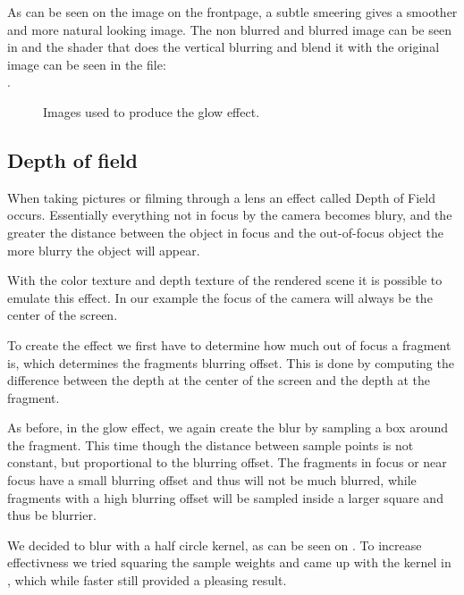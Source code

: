 As can be seen on the image on the frontpage, a subtle smeering gives
a smoother and more natural looking image. The non blurred and blurred
image can be seen in  and the shader that does the
vertical blurring and blend it with the original image can be seen in
the file:\\ .

\begin{figure}
  \centering
  \caption{Images used to produce the glow effect.}
  \label{fig:glow}
\end{figure}


\subsection{Depth of field}

When taking pictures or filming through a lens an effect called Depth
of Field occurs. Essentially everything not in focus by the camera
becomes blury, and the greater the distance between the object in
focus and the out-of-focus object the more blurry the object will
appear.

With the color texture and depth texture of the rendered scene it is
possible to emulate this effect. In our example the focus of the
camera will always be the center of the screen.

To create the effect we first have to determine how much out of focus
a fragment is, which determines the fragments blurring offset. This is
done by computing the difference between the depth at the center of
the screen and the depth at the fragment.

As before, in the glow effect, we again create the blur by sampling a
box around the fragment. This time though the distance between sample
points is not constant, but proportional to the blurring offset. The
fragments in focus or near focus have a small blurring offset and thus
will not be much blurred, while fragments with a high blurring offset
will be sampled inside a larger square and thus be blurrier.

We decided to blur with a half circle kernel, as can be seen on
. To increase effectivness we tried squaring
the sample weights and came up with the kernel in
, which while faster still provided a pleasing
result.

